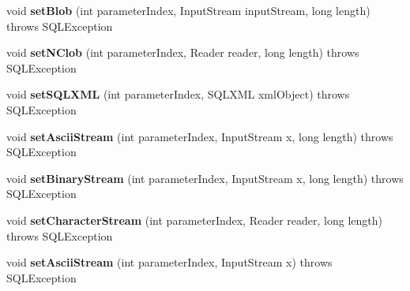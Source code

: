 \begin{DoxyCompactItemize}
\item 
\mbox{\label{classcom_1_1mysql_1_1cj_1_1jdbc_1_1_prepared_statement_wrapper_a9b6a332a9a9f4d7c2c72b7a012bb7a55}} 
void {\bfseries set\+Blob} (int parameter\+Index, Input\+Stream input\+Stream, long length)  throws S\+Q\+L\+Exception 
\item 
\mbox{\label{classcom_1_1mysql_1_1cj_1_1jdbc_1_1_prepared_statement_wrapper_a36e3eabe36d5618c0640d7e7911acea0}} 
void {\bfseries set\+N\+Clob} (int parameter\+Index, Reader reader, long length)  throws S\+Q\+L\+Exception 
\item 
\mbox{\label{classcom_1_1mysql_1_1cj_1_1jdbc_1_1_prepared_statement_wrapper_afba350036cb2360c61678b08add485ea}} 
void {\bfseries set\+S\+Q\+L\+X\+ML} (int parameter\+Index, S\+Q\+L\+X\+ML xml\+Object)  throws S\+Q\+L\+Exception 
\item 
\mbox{\label{classcom_1_1mysql_1_1cj_1_1jdbc_1_1_prepared_statement_wrapper_afa25628f80a3f5c3ad48dad5db339b8a}} 
void {\bfseries set\+Ascii\+Stream} (int parameter\+Index, Input\+Stream x, long length)  throws S\+Q\+L\+Exception 
\item 
\mbox{\label{classcom_1_1mysql_1_1cj_1_1jdbc_1_1_prepared_statement_wrapper_aa7a0fe6a418116388b6506b184071259}} 
void {\bfseries set\+Binary\+Stream} (int parameter\+Index, Input\+Stream x, long length)  throws S\+Q\+L\+Exception 
\item 
\mbox{\label{classcom_1_1mysql_1_1cj_1_1jdbc_1_1_prepared_statement_wrapper_aa81065eaf24cabb1ae64a802f076d84f}} 
void {\bfseries set\+Character\+Stream} (int parameter\+Index, Reader reader, long length)  throws S\+Q\+L\+Exception 
\item 
\mbox{\label{classcom_1_1mysql_1_1cj_1_1jdbc_1_1_prepared_statement_wrapper_aeeb5226fe8fa2075b38b1806cbf69674}} 
void {\bfseries set\+Ascii\+Stream} (int parameter\+Index, Input\+Stream x)  throws S\+Q\+L\+Exception 

\end{DoxyCompactItemize}
